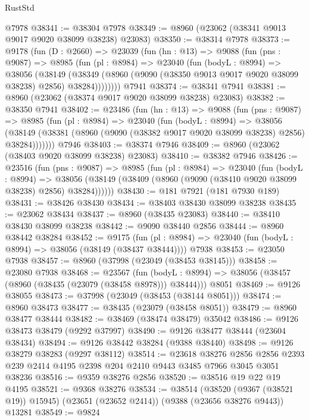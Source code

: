 \begin{lexlean}{RustStd}
\begin{coremodule}
    @7978
@38341 := @38304 @7978
@38349 := @8960 (@23062 (@38341 @9013 @9017 @9020 @38099 @38238) @23083)
@38350 := @38314 @7978
@38373 := @9178
    (fun (D : @2660) =>
    @23039
      (fun (hn : @13) =>
      @9088
        (fun (pns : @9087) =>
        @8985
          (fun (pl : @8984) =>
          @23040
            (fun (bodyL : @8994) =>
            @38056
              (@38149
                (@38349 (@8960 (@9090 (@38350 @9013 @9017 @9020 @38099 @38238) @2856) @38284))))))))
    @7941
@38374 := @38341 @7941
@38381 := @8960 (@23062 (@38374 @9017 @9020 @38099 @38238) @23083)
@38382 := @38350 @7941
@38402 := @23486
    (fun (hn : @13) =>
    @9088
      (fun (pns : @9087) =>
      @8985
        (fun (pl : @8984) =>
        @23040
          (fun (bodyL : @8994) =>
          @38056
            (@38149 (@38381 (@8960 (@9090 (@38382 @9017 @9020 @38099 @38238) @2856) @38284)))))))
    @7946
@38403 := @38374 @7946
@38409 := @8960 (@23062 (@38403 @9020 @38099 @38238) @23083)
@38410 := @38382 @7946
@38426 := @23516
    (fun (pns : @9087) =>
    @8985
      (fun (pl : @8984) =>
      @23040
        (fun (bodyL : @8994) =>
        @38056 (@38149 (@38409 (@8960 (@9090 (@38410 @9020 @38099 @38238) @2856) @38284))))))
@38430 := @181 @7921 (@181 @7930 @189)
@38431 := @38426 @38430
@38434 := @38403 @38430 @38099 @38238
@38435 := @23062 @38434
@38437 := @8960 (@38435 @23083)
@38440 := @38410 @38430 @38099 @38238
@38442 := @9090 @38440 @2856
@38444 := @8960 @38442 @38284
@38452 := @9175
    (fun (pl : @8984) => @23040 (fun (bodyL : @8994) => @38056 (@38149 (@38437 @38444))))
    @7938
@38453 := @23050 @7938
@38457 := @8960 (@37998 (@23049 (@38453 @38145)))
@38458 := @23080 @7938
@38468 := @23567
    (fun (bodyL : @8994) => @38056 (@38457 (@8960 (@38435 (@23079 (@38458 @8978))) @38444)))
    @8051
@38469 := @9126 @38055
@38473 := @37998 (@23049 (@38453 (@38144 @8051)))
@38474 := @8960 @38473
@38477 := @38435 (@23079 (@38458 @8051))
@38479 := @8960 @38477 @38444
@38482 := @38469 (@38474 @38479) @35042
@38486 := @9126 @38473 @38479 (@9292 @37997)
@38490 := @9126 @38477 @38444 (@23604 @38434)
@38494 := @9126 @38442 @38284 (@9388 @38440)
@38498 := @9126 @38279 @38283 (@9297 @38112)
@38514 := @23618
    @38276
    @2856
    @2856
    @2393
    @239
    @2414
    @4195
    @2398
    @204
    @2410
    @9443
    @3485
    @7966
    @3045
    @3051
    @38236
@38516 := @9359 @38276 @2856
@38520 := @38516 @19 @22 @19 @4195
@38521 := @9368 @38276
@38534 := @38514
    (@38520 (@9367 (@38521 @19)) @15945)
    (@23651 (@23652 @2414))
    (@9388 (@23656 @38276 @9443))
    @13281
@38549 := @9824

\end{coremodule}
\end{lexlean}
